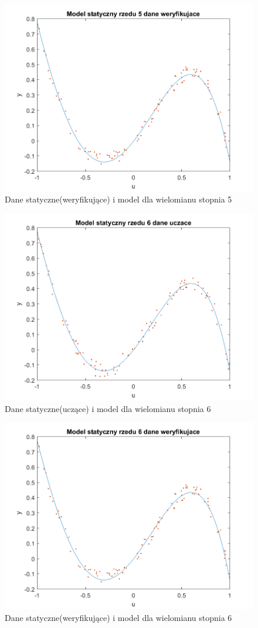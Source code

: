 \documentclass{article}
\begin{document}
\begin{figure}
\centering
\includegraphics[width=0.95\linewidth]{dane_statyczne_model_rzedu_5_weryf}
\caption{Dane statyczne(weryfikujące) i model dla wielomianu stopnia 5}
\label{fig:danestatyczneweryf5}
\end{figure}

\begin{figure}
\centering
\includegraphics[width=0.95\linewidth]{dane_statyczne_model_rzedu_6_uczace}
\caption{Dane statyczne(uczące) i model dla wielomianu stopnia 6}
\label{fig:danestatyczneuczace3}
\end{figure}

\begin{figure}
\centering
\includegraphics[width=0.95\linewidth]{dane_statyczne_model_rzedu_6_weryf}
\caption{Dane statyczne(weryfikujące) i model dla wielomianu stopnia 6}
\label{fig:danestatyczneweryf6}
\end{figure}
\end{document}
